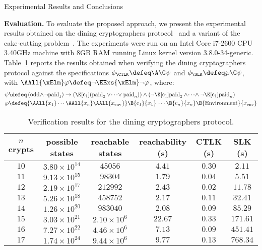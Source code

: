 




\begin{section}{Experimental Results and Conclusions}
	\label{sec:exprescon}

\textbf{Evaluation.}
To evaluate the proposed approach, we present the experimental results obtained
on the dining cryptographers protocol~\cite{Cha88,LQR09} and a variant of the
cake-cutting problem~\cite{ES84}.
The experiments were run on an Intel Core i7-2600 CPU 3.40GHz machine with 8GB
RAM running Linux kernel version 3.8.0-34-generic.
Table~\ref{tab:dining-cryptographers} reports the results obtained when
verifying the dining cryptographers protocol against the specifications
$\phi_{\CTLK} \defeq \A\G \psi$ and $\phi_{\SLK} \defeq \wp \G \psi$, with
$\AAll{\xElm} \varphi \defeq \neg \EExs{\xElm} \neg \varphi$, where:
\begin{align*}
\psi &\defeq \left(\mathrm{odd} \!\wedge\! \neg\mathrm{paid}_1\right)
\rightarrow \left(\K[\mathrm{c}_1]\! \left(\mathrm{paid}_2 \vee \!\cdots\! \vee
\mathrm{paid}_n\right)\right) \wedge \left(\neg \K[\mathrm{c}_1] \mathrm{paid}_2
\wedge \!\cdots\! \wedge \neg \K[\mathrm{c}_1] \mathrm{paid}_n\right) \\
\wp &\defeq {\AAll{x_1} \cdots \AAll{x_n} \AAll{x_{\mathrm{env}}}}
\B{\mathrm{c}_1}{x_1}
\, \cdots \B{\mathrm{c}_n}{x_n} \B{\mathrm{Environment}}{x_{\mathrm{env}}}
\end{align*}



\vspace{-2em}
\begin{table}
\centering
\caption{Verification results for the dining cryptographers protocol.}
\begin{tabular}{|c|c|c|c|c|c|}
\hline
$n$ \textbf{crypts} & \textbf{possible states} & \textbf{reachable states}
& \textbf{reachability} (s) & \textbf{CTLK} (s) & \textbf{SLK} (s) \\ \hline
$10$ & $3.80 \times 10^{14}$ & $45056$ & $4.41$ & $0.30$ & $2.11$ \\ \hline
$11$ & $9.13 \times 10^{15}$ & $98304$ & $1.79$ & $0.04$ & $5.51$ \\ \hline
$12$ & $2.19 \times 10^{17}$ & $212992$ & $2.43$ & $0.02$ & $11.78$ \\ \hline
$13$ & $5.26 \times 10^{18}$ & $458752$ & $2.17$ & $0.11$ & $32.41$ \\ \hline
$14$ & $1.26 \times 10^{20}$ & $983040$ & $2.08$ & $0.09$ & $85.29$ \\ \hline
$15$ & $3.03 \times 10^{21}$ & $2.10 \times 10^6$ & $22.67$ & $0.33$ & $171.61$
\\ \hline
$16$ & $7.27 \times 10^{22}$ & $4.46 \times 10^6$ & $7.13$ & $0.09$ & $451.41$
\\ \hline
$17$ & $1.74 \times 10^{24}$ & $9.44 \times 10^6$ & $9.77$ & $0.13$ & $768.34$
\\ \hline
\end{tabular}
\label{tab:dining-cryptographers}
\end{table}
\vspace{-1em}


\end{section}
